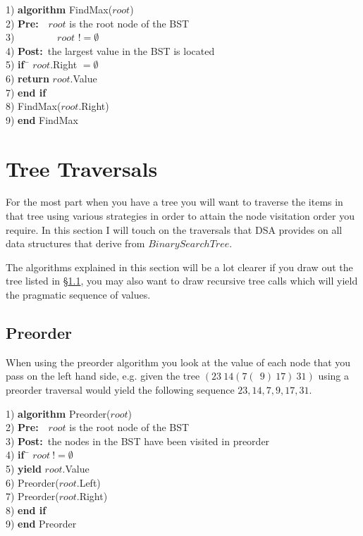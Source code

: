 \begin{tabbing}
1)  \textbf{alg}\= \textbf{orithm} FindMax($root$) \\
2)  \> \textbf{Pre:}~~$root$ is the root node of the BST \\
3)  \> ~~~~~~~~$root$ $!= \emptyset$ \\
4)  \> \textbf{Post:}~the largest value in the BST is located \\
5)  \> \textbf{if}~\= $root$.Right $= \emptyset$ \\
6)  \> \> \textbf{return} $root$.Value \\
7)  \> \textbf{end if} \\
8)  \> FindMax($root$.Right) \\
9)  \textbf{end} FindMax \\
\end{tabbing}

\section{Tree Traversals}
For the most part when you have a tree you will want to traverse the items in that tree using various strategies in order to attain the node visitation order you require. In this section I will touch on the traversals that DSA provides on all data structures that derive from $BinarySearchTree$.

The algorithms explained in this section will be a lot clearer if you draw out the tree listed in \S\ref{preorder_traversal}, you may also want to draw recursive tree calls which will yield the pragmatic sequence of values.

\subsection{Preorder} \label{preorder_traversal}
When using the preorder algorithm you look at the value of each node that you pass on the left hand side, e.g. given the tree $(23~14(7(~~9)~17)~31)$ using a preorder traversal would yield the following sequence $23, 14, 7, 9, 17, 31$.

\begin{tabbing}
1)  \textbf{alg}\= \textbf{orithm} Preorder($root$) \\
2)  \> \textbf{Pre:}~~$root$ is the root node of the BST \\
3)  \> \textbf{Post:}~the nodes in the BST have been visited in preorder \\
4)  \> \textbf{if}~\= $root~!= \emptyset$ \\
5)  \> \> \textbf{yield} $root$.Value \\
6)  \> \> Preorder($root$.Left) \\
7)  \> \> Preorder($root$.Right) \\
8)  \> \textbf{end if} \\
9)  \textbf{end} Preorder \\
\end{tabbing}

